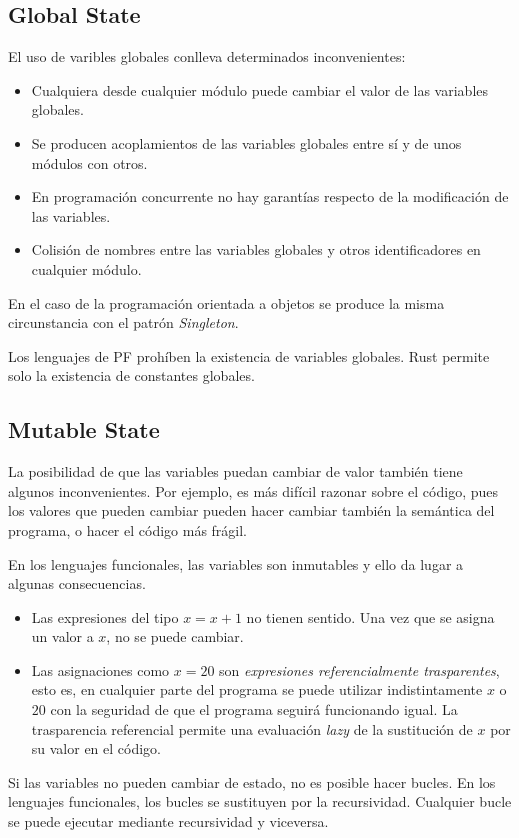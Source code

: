 \subsection{Global State}
El uso de varibles globales conlleva determinados inconvenientes:
\begin{itemize}
   \item Cualquiera desde cualquier módulo puede cambiar el valor de las variables globales.
   \item Se producen acoplamientos de las variables globales entre sí y de unos módulos con otros.
   \item En programación concurrente no hay garantías respecto de la modificación de las variables.
   \item Colisión de nombres entre las variables globales y otros identificadores en cualquier módulo.
\end{itemize}

En el caso de la programación orientada a objetos se produce la misma circunstancia con el patrón \textit{Singleton}.

Los lenguajes de PF prohíben la existencia de variables globales. Rust permite solo la existencia de constantes globales.

\subsection{Mutable State}
La posibilidad de que las variables puedan cambiar de valor también tiene algunos inconvenientes. Por ejemplo, es más difícil razonar sobre el código, pues los valores que pueden cambiar pueden hacer cambiar también la semántica del programa, o hacer el código más frágil.

En los lenguajes funcionales, las variables son inmutables y ello da lugar a algunas consecuencias.
\begin{itemize}
   \item Las expresiones del tipo $x = x +1$ no tienen sentido. Una vez que se asigna un valor a $x$, no se puede cambiar.
   \item Las asignaciones como $x=20$ son \textit{expresiones referencialmente trasparentes}, esto es, en cualquier parte del programa se puede utilizar indistintamente $x$ o $20$ con la seguridad de que el programa seguirá funcionando igual. La trasparencia referencial permite una evaluación \textit{lazy} de la sustitución de $x$ por su valor en el código.
\end{itemize}

Si las variables no pueden cambiar de estado, no es posible hacer bucles. En los lenguajes funcionales, los bucles se sustituyen por la recursividad. Cualquier bucle se puede ejecutar mediante recursividad y viceversa.

